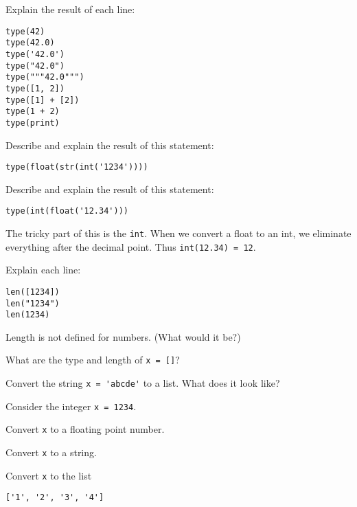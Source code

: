 \documentclass[11pt]{exam}
\begin{document}
\begin{questions}
\item Explain the result of each line:
\begin{verbatim}
type(42)
type(42.0)
type('42.0')
type("42.0")
type("""42.0""")
type([1, 2])
type([1] + [2])
type(1 + 2)
type(print)
\end{verbatim}

\item Describe and explain the result of this statement:
\begin{verbatim}
type(float(str(int('1234'))))
\end{verbatim}

\item Describe and explain the result of this statement:
\begin{verbatim}
type(int(float('12.34')))
\end{verbatim}

\begin{solution}
The tricky part of this is the {\tt int}.  When we convert a float to an int,
we eliminate everything after the decimal point.
Thus \verb$int(12.34) = 12$.
\end{solution}

\item Explain each line:
\begin{verbatim}
len([1234])
len("1234")
len(1234)
\end{verbatim}

\begin{solution}
Length is not defined for numbers.  (What would it be?)
\end{solution}

\item What are the type and length of \texttt{x = []}?


\item Convert the string \verb|x = 'abcde'| to a list.  What does it look like?

\item %
Consider the integer \texttt{x = 1234}.
\begin{parts}
\item Convert \texttt{x} to a floating point number.
\item Convert \texttt{x} to a string.
\item Convert \texttt{x} to the list
\begin{verbatim}
['1', '2', '3', '4']
\end{verbatim}
\end{parts}


\end{questions}
\end{document}
